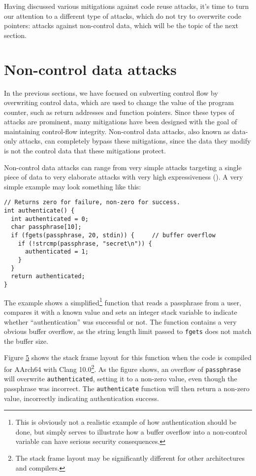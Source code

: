 \documentclass[
  a4paper,
]{report}
\begin{document}
Having discussed various mitigations against code reuse attacks, it's
time to turn our attention to a different type of attacks, which do not
try to overwrite code pointers: attacks against non-control data, which
will be the topic of the next section.

\section{Non-control data attacks}\label{non-control-data-attacks}

In the previous sections, we have focused on subverting control flow by
overwriting control data, which are used to change
the value of the program counter, such as return addresses and function
pointers. Since these types of attacks are prominent, many mitigations
have been designed with the goal of maintaining control-flow integrity.
Non-control data attacks, also known as
data-only attacks, can completely bypass these
mitigations, since the data they modify is not the control data that
these mitigations protect.

Non-control data attacks can range from very simple attacks targeting a
single piece of data to very elaborate attacks with very high
expressiveness (). A very
simple example may look something like this:

\begin{verbatim}
// Returns zero for failure, non-zero for success.
int authenticate() {
  int authenticated = 0;
  char passphrase[10];
  if (fgets(passphrase, 20, stdin)) {     // buffer overflow
    if (!strcmp(passphrase, "secret\n")) {
      authenticated = 1;
    }
  }
  return authenticated;
}
\end{verbatim}

The example shows a simplified\footnote{This is obviously not a
  realistic example of how authentication should be done, but simply
  serves to illustrate how a buffer overflow into a non-control variable
  can have serious security consequences.} function that reads a
passphrase from a user, compares it with a known value and sets an
integer stack variable to indicate whether ``authentication'' was
successful or not. The function contains a very obvious buffer overflow,
as the string length limit passed to \texttt{fgets} does not match the
buffer size.

Figure \hyperref[fig:non-control-data-attack]{5} shows the stack frame
layout for this function when the code is compiled for AArch64 with
Clang 10.0\footnote{The stack frame layout may be significantly
  different for other architectures and compilers.}. As the figure
shows, an overflow of \texttt{passphrase} will overwrite
\texttt{authenticated}, setting it to a non-zero value, even though the
passphrase was incorrect. The \texttt{authenticate} function will then
return a non-zero value, incorrectly indicating authentication success.
\end{document}
